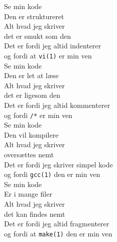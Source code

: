 \begin{flushleft}
Se min kode\\
Den er struktureret\\
Alt hvad jeg skriver\\
det er smukt som den\\
Det er fordi jeg altid indenterer\\
og fordi at \texttt{vi(1)} er min ven\\[5mm]

Se min kode\\
Den er let at læse\\
Alt hvad jeg skriver\\
det er ligesom den\\
Det er fordi jeg altid kommenterer\\
og fordi \texttt{/*} er min ven\\[5mm]

Se min kode\\
Den vil kompilere\\
Alt hvad jeg skriver\\
oversættes nemt\\
Det er fordi jeg skriver simpel kode\\
og fordi \texttt{gcc(1)} den er min ven\\[5mm]

Se min kode\\
Er i mange filer\\
Alt hvad jeg skriver\\
det kan findes nemt\\
Det er fordi jeg altid fragmenterer\\
og fordi at \texttt{make(1)} den er min ven
\end{flushleft}
\vfill

